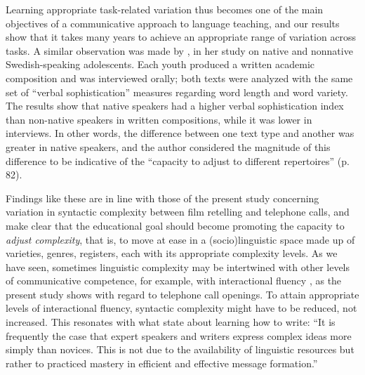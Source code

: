 \documentclass[output=paper]{langscibook}
\begin{document}
Learning appropriate task-related variation thus becomes one of the main objectives of a communicative approach to language teaching, and our results show that it takes many years to achieve an appropriate range of variation across tasks. A similar observation was made by \citet{Wiklund2002}, in her study on native and nonnative Swedish-speaking adolescents. Each youth produced a written academic composition and was interviewed orally; both texts were analyzed with the same set of “verbal sophistication” measures regarding word length and word variety. The results show that native speakers had a higher verbal sophistication index than non-native speakers in written compositions, while it was lower in interviews. In other words, the difference between one text type and another was greater in native speakers, and the author considered the magnitude of this difference to be indicative of the “capacity to adjust to different repertoires” (p. 82).

Findings like these are in line with those of the present study concerning variation in syntactic complexity between film retelling and telephone calls, and make clear that the educational goal should become promoting the capacity to \textit{adjust complexity}, that is, to move at ease in a (socio)linguistic space made up of varieties, genres, registers, each with its appropriate complexity levels. As we have seen, sometimes linguistic complexity may be intertwined with other levels of communicative competence, for example, with interactional fluency \citep{Peltonen2020}, as the present study shows with regard to telephone call openings. To attain appropriate levels of interactional fluency, syntactic complexity might have to be reduced, not increased. This resonates with what \citet[612]{LambertKormos2014} state about learning how to write: “It is frequently the case that expert speakers and writers express complex ideas more simply than novices. This is not due to the availability of linguistic resources but rather to practiced mastery in efficient and effective message formation.”
\end{document}
